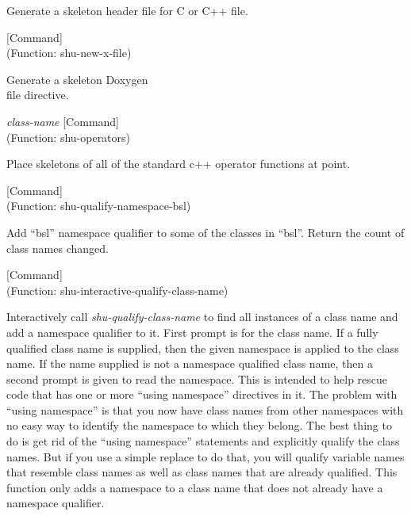 \begin{doc-string}
Generate a skeleton header file for C or C++ file.
\end{doc-string}

\vspace{1em}
\noindent
{}
\usebox{\funcname}
 \hfill [Command]\\%
 (Function: shu-new-x-file)

\begin{doc-string}
Generate a skeleton Doxygen \\file directive.
\end{doc-string}

\vspace{1em}
\noindent
{}
\usebox{\funcname}\emph{class-name}
 \hfill [Command]\\%
 (Function: shu-operators)

\begin{doc-string}
Place skeletons of all of the standard c++ operator functions at point.
\end{doc-string}

\vspace{1em}
\noindent
{}
\usebox{\funcname}
 \hfill [Command]\\%
 (Function: shu-qualify-namespace-bsl)

\begin{doc-string}
Add ``bsl'' namespace qualifier to some of the classes in ``bsl''.  Return the
count of class names changed.
\end{doc-string}

\vspace{1em}
\noindent
{}
\usebox{\funcname}
 \hfill [Command]\\%
 (Function: shu-interactive-qualify-class-name)

\begin{doc-string}
Interactively call \emph{shu-qualify-class-name} to find all instances of a class name and
add a namespace qualifier to it.  First prompt is for the class name.  If a fully qualified
class name is supplied, then the given namespace is applied to the class name.  If the name
supplied is not a namespace qualified class name, then a second prompt is given to read the
namespace.
This is intended to help rescue code that has one or more ``using namespace''
directives in it.  The problem with ``using namespace'' is that you now have
class names from other namespaces with no easy way to identify the namespace
to which they belong.  The best thing to do is get rid of the ``using
namespace'' statements and explicitly qualify the class names.  But if you
use a simple replace to do that, you will qualify variable names that resemble
class names as well as class names that are already qualified.  This function
only adds a namespace to a class name that does not already have a namespace
qualifier.
\end{doc-string}

